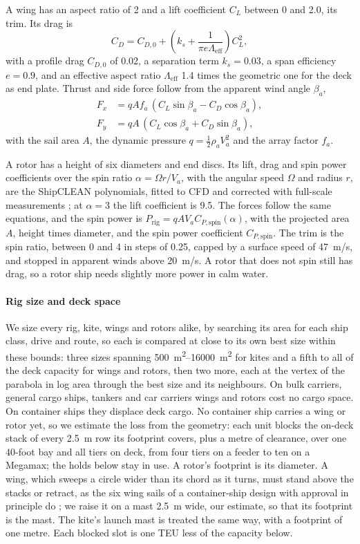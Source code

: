 A wing has an aspect ratio of 2 and a lift coefficient $C_L$ between 0 and 2.0, its trim. Its drag is
\begin{equation}
C_D = C_{D,0} + \left(k_s + \frac{1}{\pi e \Lambda_\mathrm{eff}}\right) C_L^2,
\end{equation}
with a profile drag $C_{D,0}$ of 0.02, a separation term $k_s=0.03$, a span efficiency $e=0.9$, and an effective aspect ratio $\Lambda_\mathrm{eff}$ 1.4 times the geometric one for the deck as end plate. Thrust and side force follow from the apparent wind angle $\beta_a$,
\begin{align}
F_x &= q A f_a\, (C_L\sin\beta_a - C_D\cos\beta_a),\\
F_y &= q A\, (C_L\cos\beta_a + C_D\sin\beta_a),
\end{align}
with the sail area $A$, the dynamic pressure $q=\tfrac12\rho_a V_a^2$ and the array factor $f_a$.

A rotor has a height of six diameters and end discs. Its lift, drag and spin power coefficients over the spin ratio $\alpha=\Omega r/V_a$, with the angular speed $\Omega$ and radius $r$, are the ShipCLEAN polynomials, fitted to CFD and corrected with full-scale measurements \citep{tillig2020}; at $\alpha=3$ the lift coefficient is 9.5. The forces follow the same equations, and the spin power is $P_\mathrm{rig} = q A V_a C_{P,\mathrm{spin}}(\alpha)$, with the projected area $A$, height times diameter, and the spin power coefficient $C_{P,\mathrm{spin}}$. The trim is the spin ratio, between 0 and 4 in steps of 0.25, capped by a surface speed of \SI{47}{m/s}, and stopped in apparent winds above \SI{20}{m/s}. A rotor that does not spin still has drag, so a rotor ship needs slightly more power in calm water.

\paragraph{Rig size and deck space} We size every rig, kite, wings and rotors alike, by searching its area for each ship class, drive and route, so each is compared at close to its own best size within these bounds: three sizes spanning \SIrange{500}{16000}{m^2} for kites and a fifth to all of the deck capacity for wings and rotors, then two more, each at the vertex of the parabola in log area through the best size and its neighbours. On bulk carriers, general cargo ships, tankers and car carriers wings and rotors cost no cargo space. On container ships they displace deck cargo. No container ship carries a wing or rotor yet, so we estimate the loss from the geometry: each unit blocks the on-deck stack of every \SI{2.5}{m} row its footprint covers, plus a metre of clearance, over one 40-foot bay and all tiers on deck, from four tiers on a feeder to ten on a Megamax; the holds below stay in use. A rotor's footprint is its diameter. A wing, which sweeps a circle wider than its chord as it turns, must stand above the stacks or retract, as the six wing sails of a container-ship design with approval in principle do \citep{gcaptain2021vplp}; we raise it on a mast \SI{2.5}{m} wide, our estimate, so that its footprint is the mast. The kite's launch mast is treated the same way, with a footprint of one metre. Each blocked slot is one TEU less of the capacity below.

